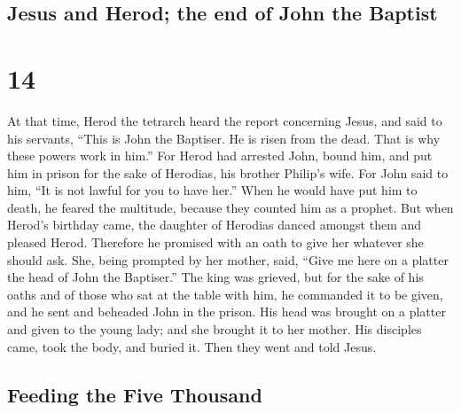 \hypertarget{jesus-and-herod-the-end-of-john-the-baptist}{%
\subsection{Jesus and Herod; the end of John the
Baptist}\label{jesus-and-herod-the-end-of-john-the-baptist}}

\hypertarget{section-13}{%
\section{14}\label{section-13}}

 At that time, Herod the tetrarch heard the report
concerning Jesus,  and said to his servants, ``This is
John the Baptiser. He is risen from the dead. That is why these powers
work in him.''  For Herod had arrested John, bound him,
and put him in prison for the sake of Herodias, his brother Philip's
wife.  For John said to him, ``It is not lawful for you to
have her.''  When he would have put him to death, he
feared the multitude, because they counted him as a prophet.
 But when Herod's birthday came, the daughter of Herodias
danced amongst them and pleased Herod.  Therefore he
promised with an oath to give her whatever she should ask.
 She, being prompted by her mother, said, ``Give me here
on a platter the head of John the Baptiser.''  The king
was grieved, but for the sake of his oaths and of those who sat at the
table with him, he commanded it to be given,  and he sent
and beheaded John in the prison.  His head was brought on
a platter and given to the young lady; and she brought it to her mother.
 His disciples came, took the body, and buried it. Then
they went and told Jesus.

\hypertarget{feeding-the-five-thousand}{%
\subsection{Feeding the Five Thousand}\label{feeding-the-five-thousand}}

